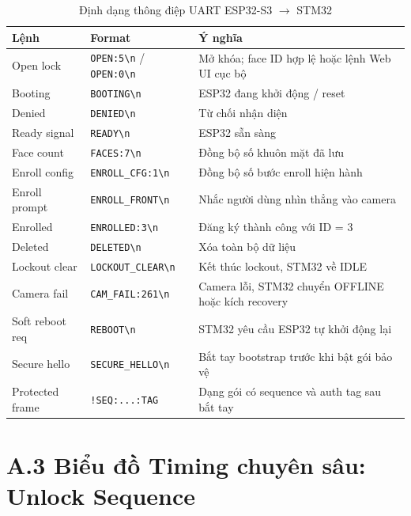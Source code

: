 \begin{table}[H]
  \centering
  \small
  \caption{Định dạng thông điệp UART ESP32-S3 $\to$ STM32}
  \label{tab:uart_msg_format}
  \begin{tabularx}{0.95\textwidth}{>{\raggedright\arraybackslash}p{2.6cm} >{\ttfamily\raggedright\arraybackslash}p{4.0cm} Y}
    \toprule
    \textbf{Lệnh} & \textbf{Format} & \textbf{Ý nghĩa} \\
    \midrule
    Open lock       & \texttt{OPEN:5\textbackslash n} / \texttt{OPEN:0\textbackslash n} & Mở khóa; face ID hợp lệ hoặc lệnh Web UI cục bộ \\
    Booting         & \texttt{BOOTING\textbackslash n} & ESP32 đang khởi động / reset \\
    Denied          & \texttt{DENIED\textbackslash n} & Từ chối nhận diện \\
    Ready signal    & \texttt{READY\textbackslash n} & ESP32 sẵn sàng \\
    Face count      & \texttt{FACES:7\textbackslash n} & Đồng bộ số khuôn mặt đã lưu \\
    Enroll config   & \texttt{ENROLL\_CFG:1\textbackslash n} & Đồng bộ số bước enroll hiện hành \\
    Enroll prompt   & \texttt{ENROLL\_FRONT\textbackslash n} & Nhắc người dùng nhìn thẳng vào camera \\
    Enrolled        & \texttt{ENROLLED:3\textbackslash n} & Đăng ký thành công với ID = 3 \\
    Deleted         & \texttt{DELETED\textbackslash n} & Xóa toàn bộ dữ liệu \\
    Lockout clear   & \texttt{LOCKOUT\_CLEAR\textbackslash n} & Kết thúc lockout, STM32 về IDLE \\
    Camera fail     & \texttt{CAM\_FAIL:261\textbackslash n} & Camera lỗi, STM32 chuyển OFFLINE hoặc kích recovery \\
    Soft reboot req & \texttt{REBOOT\textbackslash n} & STM32 yêu cầu ESP32 tự khởi động lại \\
    Secure hello    & \texttt{SECURE\_HELLO\textbackslash n} & Bắt tay bootstrap trước khi bật gói bảo vệ \\
    Protected frame & \texttt{!SEQ:...:TAG} & Dạng gói có sequence và auth tag sau bắt tay \\
    \bottomrule
  \end{tabularx}
\end{table}

\section*{A.3 \quad Biểu đồ Timing chuyên sâu: Unlock Sequence}

